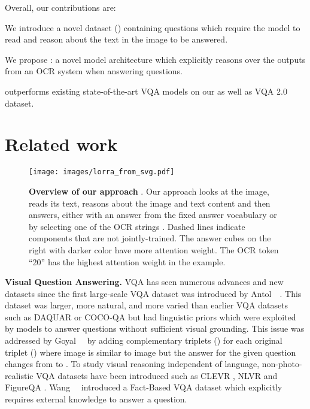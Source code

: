 \documentclass[10pt,twocolumn,letterpaper]{article}
\begin{document}
Overall, our contributions are:

\begin{compactitem}
\item We introduce a novel dataset (\datasetName) containing questions which require the model to read and reason about the text in the image to be answered. 
\item We propose \approachName: a novel model architecture which explicitly reasons over the outputs from an OCR system when answering questions. 
\item \approachNameShort outperforms existing state-of-the-art VQA models on our \datasetName as well as VQA 2.0 dataset.
\end{compactitem}
 
\vspace{-2mm}
\section{Related work}
\vspace{-2mm}
\begin{figure*}
    \centering
    \texttt{[image: images/lorra\_from\_svg.pdf]}
    \caption{\textbf{Overview of our approach \approachName}. Our approach looks at the image, reads its text, reasons about the image and text content and then answers, either with an answer  from the fixed answer vocabulary or by selecting one of the OCR strings . Dashed lines indicate components that are not jointly-trained. The answer cubes on the right with darker color have more attention weight. The OCR token ``20'' has the highest attention weight in the example.
    }
    \label{fig:model}
    \vspace{-3mm}
\end{figure*}
\textbf{Visual Question Answering.} VQA has seen numerous advances and new datasets since the first large-scale VQA dataset was introduced by Antol~\etal~\cite{antol2015vqa}. 
This dataset was larger, more natural, and more varied than earlier VQA datasets such as DAQUAR \cite{malinowski2014multi} or COCO-QA \cite{ren2015exploring} but had linguistic priors which were exploited by models to answer questions without sufficient visual grounding. This issue was addressed by Goyal~\etal~\cite{balanced_vqa_v2} by adding complementary triplets () for each original triplet () where image  is similar to image  but the answer for the given question  changes from  to . To study visual reasoning independent of language, non-photo-realistic VQA datasets have been introduced such as CLEVR \cite{johnson2017clevr}, NLVR \cite{suhr2017corpus} and FigureQA \cite{kahou2017figureqa}.
Wang~\etal~\cite{wang2018fvqa} introduced a Fact-Based VQA dataset which explicitly requires external knowledge to answer a question. 
\end{document}
